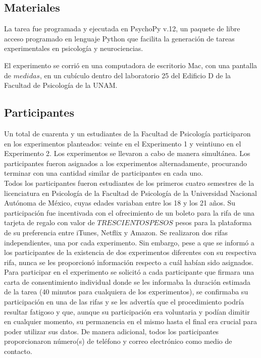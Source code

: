 \subsection{Materiales}

La tarea fue programada y ejecutada en PsychoPy v.12, un paquete de libre acceso programado en lenguaje Python que facilita la generación de tareas experimentales en psicología y neurociencias.

El experimento se corrió en una computadora de escritorio Mac, con una pantalla de $medidas$, en un cubículo dentro del laboratorio 25 del Edificio D de la Facultad de Psicología de la UNAM.

\subsection{Participantes}

Un total de cuarenta y un estudiantes de la Facultad de Psicología participaron en los experimentos planteados: veinte en el Experimento 1 y veintiuno en el Experimento 2. Los experimentos se llevaron a cabo de manera simultánea. Los participantes fueron asignados a los experimentos alternadamente, procurando terminar con una cantidad similar de participantes en cada uno.\\

Todos los participantes fueron estudiantes de los primeros cuatro semestres de la licenciatura en Psicología de la Facultad de Psicología de la Universidad Nacional Autónoma de México, cuyas edades variaban entre los 18 y los 21 años. Su participación fue incentivada con el ofrecimiento de un boleto para la rifa de una tarjeta de regalo con valor de $TRESCIENTOS PESOS$ pesos para la plataforma de su preferencia entre iTunes, Netflix y Amazon. Se realizaron dos rifas independientes, una por cada experimento. Sin embargo, pese a que se informó a los participantes de la existencia de dos experimentos diferentes con su respectiva rifa, nunca se les proporcionó información respecto a cuál habían sido asignados.\\ 

Para participar en el experimento se solicitó a cada participante que firmara una carta de consentimiento individual donde se les informaba la duración estimada de la tarea (40 minutos para cualquiera de los experimentos), se confirmaba su participación en una de las rifas y se les advertía que el procedimiento podría resultar fatigoso y que, aunque su participación era voluntaria y podían dimitir en cualquier momento, su permanencia en el mismo hasta el final era crucial para poder utilizar sus datos. De manera adicional, todos los participantes proporcionaron número(s) de teléfono y correo electrónico como medio de contacto.\\

